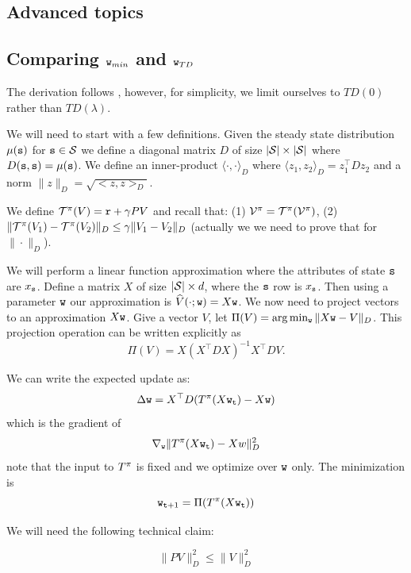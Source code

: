 \begin{leftbar}
\section{Advanced topics}
\label{sec:FA-Advanced}

\subsection{Comparing ${\tt w}_{min}$ and ${\tt w}_{TD}$}

The derivation follows \cite{TsitsiklisVR97}, however, for
simplicity, we limit ourselves to $TD(0)$ rather than $TD(\lambda)$.

We will need to start with a few definitions. Given the steady state
distribution $\mu({\tt s})$ for ${\tt s}\in \mathcal{S}$ we define a
diagonal matrix $D$ of size $|\mathcal{S}|\times|\mathcal{S}|$ where
$D({\tt s},{\tt s})=\mu({\tt s})$. We define an inner-product
$\langle\cdot,\cdot\rangle_D$ where $\langle
z_1,z_2\rangle_D=z_1^\top Dz_2$ and a norm $\|z\|_D=\sqrt{<z,z>_D}$.

We define $\mathcal{T}^\pi(V)= {\tt r} + \gamma PV$ and recall
that: (1) $\mathcal{V}^\pi = \mathcal{T}^\pi(\mathcal{V}^\pi)$, (2)
$\|\mathcal{T}^\pi(V_1)-\mathcal{T}^\pi(V_2)\|_D\leq \gamma
\|V_1-V_2\|_D$ (actually we we need to prove that for
$\|\cdot\|_D$).

We will perform a linear function approximation where the attributes
of state ${\tt s}$ are $x_{\tt s}$. Define a matrix $X$ of size
$|\mathcal{S}|\times d$, where the ${\tt s}$ row is $x_{\tt s}$. Then
using a parameter ${\tt w}$ our approximation is
$\widehat{V}(\cdot;{\tt w})=X{\tt w}$. We now need to project
vectors to an approximation $X{\tt w}$. Give a vector $V$, let
$\Pi(V)=\arg\min_{\tt w} \|X{\tt w}-V\|_D$. This projection
operation can be written explicitly as
\[
\Pi(V)=X(X^\top DX)^{-1}X^\top D V.
\]


We can write the expected update as:
\[
\Delta {\tt w}= X^\top D(T^\pi(X{\tt w}_{\tt t})-X{\tt w})
\]
which is the gradient of
\[
\nabla_{\tt w} \|T^\pi(X{\tt w}_{\tt t})-Xw\|_D^2
\]
note that the input to $T^\pi$ is fixed and we optimize over
${\tt w}$ only. The minimization is
\[
{\tt w}_{{\tt t}+1}=\Pi(T^\pi(X{\tt w}_{\tt t}))
\]

We will need the following technical claim:
\begin{claim}
\[
\|PV\|_D^2\leq \|V\|_D^2
\]
\end{claim}


\end{leftbar}
